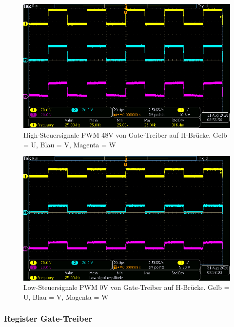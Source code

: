 \begin{figure}[H]
\center
\includegraphics[width = \textwidth]{graphics/TMC6200_Gate_Signal_H}
\caption{High-Steuersignale PWM 48V von Gate-Treiber auf H-Brücke. Gelb = U, Blau = V, Magenta = W}
\label{fig:TMC6200_Gate_Signal_H}
\end{figure}

\begin{figure}[H]
\center
\includegraphics[width = \textwidth]{graphics/TMC6200_Gate_Signal_L}
\caption{Low-Steuersignale PWM 0V von Gate-Treiber auf H-Brücke. Gelb = U, Blau = V, Magenta = W}
\label{fig:TMC6200_Gate_Signal_L}
\end{figure}


\subsubsection{Register Gate-Treiber}\label{Appendix:TMC6200_Register}

